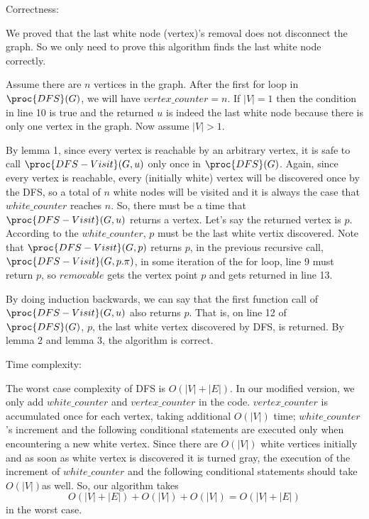 \documentclass[11pt, answers]{exam}
\theoremstyle{plain}
\theoremstyle{definition}
\begin{document}
\begin{questions}
\begin{solution}
Correctness: 

We proved that the last white node (vertex)'s removal does not disconnect the graph. So we only need to prove this algorithm finds the last white node correctly.

Assume there are $n$ vertices in the graph. After the first for loop in $\proc{DFS}(G)$, we will have $vertex\_counter = n$. If $|V| = 1$ then the condition in line 10 is true and the returned $u$ is indeed the last white node because there is only one vertex in the graph. Now assume $|V|>1$.

By lemma 1, since every vertex is reachable by an arbitrary vertex, it is safe to call $\proc{DFS-Visit}(G,u)$ only once in $\proc{DFS}(G)$. Again, since every vertex is reachable, every (initially white) vertex will be discovered once by the DFS, so a total of $n$ white nodes will be visited and it is always the case that $white\_counter$ reaches $n$. So, there must be a time that $\proc{DFS-Visit}(G,u)$ returns a vertex. Let's say the returned vertex is $p$. According to the $white\_counter$, $p$ must be the last white vertix discovered. Note that $\proc{DFS-Visit}(G,p)$ returns $p$, in the previous recursive call, $\proc{DFS-Visit}(G,p.\pi)$, in some iteration of the for loop, line 9 must return $p$, so $removable$ gets the vertex point $p$ and gets returned in line 13.

By doing induction backwards, we can say that the first function call of $\proc{DFS-Visit}(G,u)$ also returns $p$. That is, on line 12 of $\proc{DFS}(G)$, $p$, the last white vertex discovered by DFS, is returned. By lemma 2 and lemma 3, the algorithm is correct.

Time complexity:

The worst case complexity of DFS is $O(|V|+|E|)$. In our modified version, we only add $white\_counter$ and $vertex\_counter$ in the code. $vertex\_counter$ is accumulated once for each vertex, taking additional $O(|V|)$ time; $white\_counter$'s increment and the following conditional statements are executed only when encountering a new white vertex. Since there are $O(|V|)$ white vertices initially and as soon as white vertex is discovered it is turned gray, the execution of the increment of $white\_counter$ and the following conditional statements should take $O(|V|)$as well. So, our algorithm takes $$O(|V|+|E|)+O(|V|)+O(|V|)=O(|V|+|E|)$$ in the worst case.

\end{solution}

\question
\begin{solution}
\begin{parts}

\end{parts}
\end{solution}
\end{questions}
\end{document}

